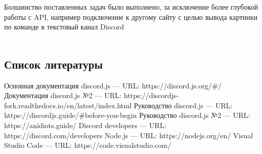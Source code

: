 \documentclass[a4paper,12pt]{article}
\begin{document}
Болшинство поставленных задач было выполнено, за исключение более глубокой работы с API, например подключение к другому сайту с целью вывода картинки по команде в текстовый канал Discord\\ \\


\newpage
\large
\begin{thebibliography}{100}

\section{Список литературы}
 Основная документация discord.js — URL: https://discord.js.org/#/
 Документация discord.js №2 — URL: https://discordjs-fork.readthedocs.io/en/latest/index.html
 Руководство discord.js — URL: https://discordjs.guide/#before-you-begin
 Руководство discord.js №2 — URL: https://anidiots.guide/
 Discord developers — URL: https://discord.com/developers
 Node.js — URL: https://nodejs.org/en/
 Visual Studio Code — URL: https://code.visualstudio.com/
\end{thebibliography}

\end{document}

